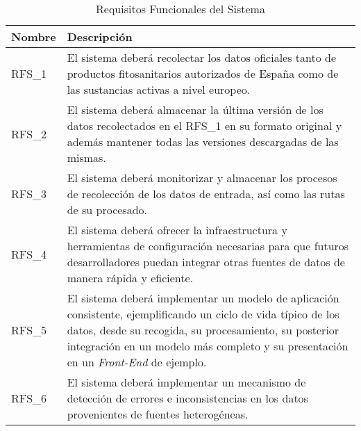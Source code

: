 \begin{table}[!h]
\centering
\bgroup
\def\arraystretch{1.3}
\begin{tabular}{l p{13cm}}
\toprule
\textbf{Nombre} & \textbf{Descripción} \\
 \midrule
RFS\_1 & 
El sistema deberá recolectar los datos oficiales tanto de productos fitosanitarios autorizados de España como de las sustancias activas a nivel europeo.
 \\
RFS\_2 & 
El sistema deberá almacenar la última versión de los datos recolectados en el RFS\_1 en su formato original y además mantener todas las versiones descargadas de las mismas. 
 \\
RFS\_3 & 
El sistema deberá monitorizar y almacenar los procesos de recolección de los datos de entrada, así como las rutas de su procesado. 
 \\
RFS\_4 & 
El sistema deberá ofrecer la infraestructura y herramientas de configuración necesarias para que futuros desarrolladores puedan integrar otras fuentes de datos de manera rápida y eficiente. 
 \\
RFS\_5 & 
El sistema deberá implementar un modelo de aplicación consistente, ejemplificando un ciclo de vida típico de los datos, desde su recogida, su procesamiento, su posterior integración en un modelo más completo y su presentación en un \textit{Front-End} de ejemplo.
 \\
RFS\_6 & 
El sistema deberá implementar un mecanismo de detección de errores e inconsistencias en los datos provenientes de fuentes heterogéneas.
 \\
\bottomrule
\end{tabular}
\egroup
\caption{Requisitos Funcionales del Sistema}
\label{tab:req_func_sist}
\end{table}


